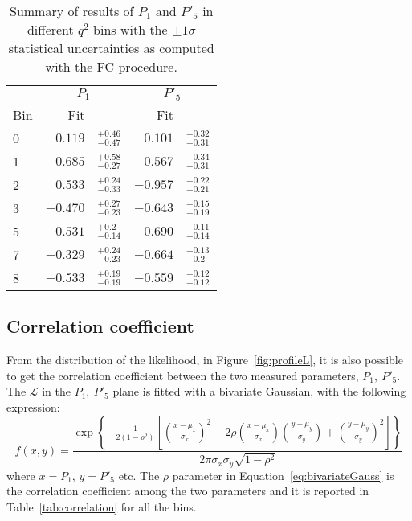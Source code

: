 \begin{table*}[!htb]

  \begin{center}
    \caption{Summary of results of $P_1$ and $P'_5$ in different $q^2$ bins with the $\pm1\sigma$ statistical uncertainties as computed with the FC procedure.}\label{tab:FC}

    \begin{tabular}{l|rl|rl}
      & \multicolumn{2}{c|}{$P_1$} &  \multicolumn{2}{c}{$P'_5$} \\ 
      Bin  & Fit & & Fit &   \\ 
      \hline
      0 &  $0.119 $  &$^{+ 0.46}_{- 0.47}$ & $0.101$  & $^{+ 0.32}_{- 0.31}$ \\
      1 &  $-0.685$ &$^{+ 0.58}_{- 0.27}$  & $-0.567$ & $^{+ 0.34}_{- 0.31}$ \\
      2 &  $0.533 $  &$^{+ 0.24}_{- 0.33}$ & $-0.957$ & $^{+ 0.22}_{- 0.21}$ \\
      3 &  $-0.470$ &$^{+ 0.27}_{- 0.23}$  & $-0.643$ & $^{+ 0.15}_{- 0.19}$ \\
      5 &  $-0.531$ &$^{+ 0.2}_{- 0.14} $  & $-0.690$ & $^{+ 0.11}_{- 0.14}$ \\
      7 &  $-0.329$ &$^{+ 0.24}_{- 0.23}$  & $-0.664$ & $^{+ 0.13}_{- 0.2}$ \\
      8 &  $-0.533$ &$^{+ 0.19}_{- 0.19}$  & $-0.559$ & $^{+ 0.12}_{- 0.12}$ \\
      \hline                                                  

    \end{tabular}
  \end{center}
\end{table*}

\clearpage
\subsection{Correlation coefficient}

From the distribution of the likelihood, in Figure~\ref{fig:profileL}, it is also possible to get the correlation coefficient between the two measured parameters, $P_1,~P'_5$.
The $\mathcal{L}$ in the $P_1,~P'_5$ plane is fitted with a bivariate Gaussian, with the following expression:
\begin{equation}\label{eq:bivariateGauss}
  f(x,y)=\frac{\exp \left\{ -\frac 1{2(1-\rho ^2)}\left[ \left( \frac{x-\mu _x}{\sigma _x}\right) ^2-2\rho \left( \frac{x-\mu _x}{\sigma _x}\right) \left(\frac{y-\mu _y}{\sigma _y}\right) +\left( \frac{y-\mu _y}{\sigma _y}\right)^2\right] \right\} }{2\pi \sigma _x\sigma _y\sqrt{1-\rho ^2}} 
\end{equation}
where $x=P_1$, $y=P'_5$ etc. The $\rho$ parameter in Equation~\ref{eq:bivariateGauss} is the correlation coefficient among the two parameters and it is reported in Table~\ref{tab:correlation} for all the bins.

